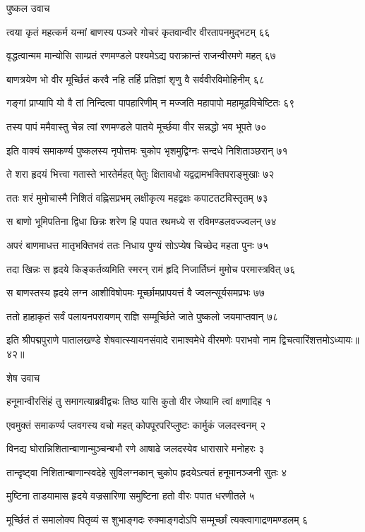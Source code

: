 पुष्कल उवाच

त्वया कृतं महत्कर्म यन्मां बाणस्य पञ्जरे
गोचरं कृतवान्वीर वीरतापनमुद्भटम् ६६

वृद्धत्वान्मम मान्योसि साम्प्रतं रणमण्डले
पश्यमेऽद्य पराक्रान्तं राजन्वीरमणे महत् ६७

बाणत्रयेण भो वीर मूर्च्छितं करवै नहि
तर्हि प्रतिज्ञां शृणु वै सर्ववीरविमोहिनीम् ६८

गङ्गां प्राप्यापि यो वै तां निन्दित्वा पापहारिणीम्
न मज्जति महापापो महामूढविचेष्टितः ६९

तस्य पापं ममैवास्तु चेन्न त्वां रणमण्डले
पातये मूर्च्छया वीर सन्नद्धो भव भूपते ७०

इति वाक्यं समाकर्ण्य पुष्कलस्य नृपोत्तमः
चुकोप भृशमुद्विग्नः सन्दधे निशिताञ्छरान् ७१

ते शरा हृदयं भित्त्वा गतास्ते भारतेर्महत्
पेतुः क्षितावधो यद्वद्रामभक्तिपराङ्मुखाः ७२

ततः शरं मुमोचास्मै निशितं वह्निसप्रभम्
लक्षीकृत्य महद्वक्षः कपाटतटविस्तृतम् ७३

स बाणो भूमिपतिना द्विधा छिन्नः शरेण हि
पपात रथमध्ये स रविमण्डलवज्ज्वलन् ७४

अपरं बाणमाधत्त मातृभक्तिभवं ततः
निधाय पुण्यं सोऽप्येष चिच्छेद महता पुनः ७५

तदा खिन्नः स हृदये किङ्कर्तव्यमिति स्मरन्
रामं हृदि निजार्तिघ्नं मुमोच परमास्त्रवित् ७६

स बाणस्तस्य हृदये लग्न आशीविषोपमः
मूर्च्छामप्रापयत्तं वै ज्वलन्सूर्यसमप्रभः ७७

ततो हाहाकृतं सर्वं पलायनपरायणम्
राज्ञि सम्मूर्च्छिते जाते पुष्कलो जयमाप्तवान् ७८

इति श्रीपद्मपुराणे पातालखण्डे शेषवात्स्यायनसंवादे रामाश्वमेधे वीरमणेः पराभवो नाम द्विचत्वारिंशत्तमोऽध्यायः॥४२॥


शेष उवाच

हनूमान्वीरसिंहं तु समागत्याब्रवीद्वचः
तिष्ठ यासि कुतो वीर जेष्यामि त्वां क्षणादिह १

एवमुक्तं समाकर्ण्य प्लवगस्य वचो महत्
कोपपूरपरिप्लुष्टः कार्मुकं जलदस्वनम् २

विनद्य घोरान्निशितान्बाणान्मुञ्चन्बभौ रणे
आषाढे जलदस्येव धारासारे मनोहरः ३

तान्दृष्ट्वा निशितान्बाणान्स्वदेहे सुविलग्नकान्
चुकोप हृदयेऽत्यतं हनूमानञ्जनी सुतः ४

मुष्टिना ताडयामास हृदये वज्रसारिणा
समुष्टिना हतो वीरः पपात धरणीतले ५

मूर्च्छितं तं समालोक्य पितृव्यं स शुभाङ्गदः
रुक्माङ्गदोऽपि सम्मूर्च्छां त्यक्त्वागाद्रणमण्डलम् ६

